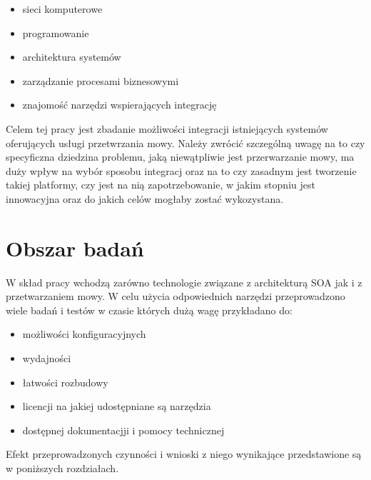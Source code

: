  \begin{itemize}
	\item sieci komputerowe
	\item programowanie
	\item architektura systemów
	\item zarządzanie procesami biznesowymi
	\item znajomość narzędzi wspierających integrację
\end{itemize} 
Celem tej pracy jest zbadanie możliwości integracji istniejących systemów oferujących usługi przetwrzania mowy. Należy zwrócić szczególną uwagę na to czy specyficzna dziedzina problemu, jaką niewątpliwie jest przerwarzanie mowy, ma duży wpływ na wybór sposobu integracj oraz na to czy zasadnym jest tworzenie takiej platformy, czy jest na nią zapotrzebowanie, w jakim stopniu jest innowacyjna oraz do jakich celów mogłaby zostać wykozystana.

\section{Obszar badań} %
W skład  pracy wchodzą zarówno technologie związane z architekturą SOA jak i z przetwarzaniem mowy. W celu użycia odpowiednich narzędzi przeprowadzono wiele badań i testów w czasie których dużą wagę przykładano do:
\begin{itemize}
 	\item możliwości konfiguracyjnych
	\item wydajności
	\item łatwości rozbudowy
	\item licencji na jakiej udostępniane są narzędzia
	\item dostępnej dokumentacjji i pomocy technicznej
\end{itemize}
Efekt przeprowadzonych czynności i wnioski z niego wynikające przedstawione są w poniższych rozdziałach.


